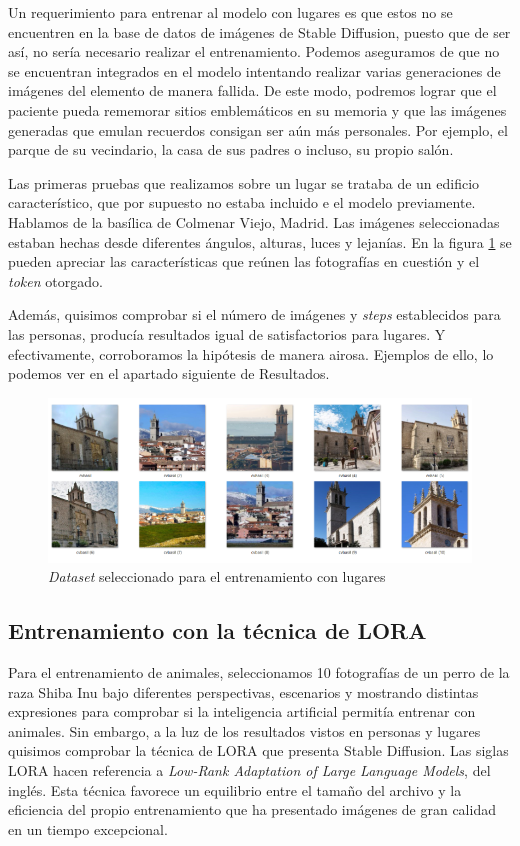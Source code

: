 Un requerimiento para entrenar al modelo con lugares es que estos no se encuentren en la base de datos de imágenes de Stable Diffusion, puesto que de ser así, no sería necesario realizar el entrenamiento. Podemos aseguramos de que no se encuentran integrados en el modelo intentando realizar varias generaciones de imágenes del elemento de manera fallida. De este modo, podremos lograr que el paciente pueda rememorar sitios emblemáticos en su memoria y que las imágenes generadas que emulan recuerdos consigan ser aún más personales. Por ejemplo, el parque de su vecindario, la casa de sus padres o incluso, su propio salón. 

Las primeras pruebas que realizamos sobre un lugar se trataba de un edificio característico, que por supuesto no estaba incluido e el modelo previamente. Hablamos de la basílica de Colmenar Viejo, Madrid. Las imágenes seleccionadas estaban hechas desde diferentes ángulos, alturas, luces y lejanías. En la figura \ref{fig:datasetcolme} se pueden apreciar las características que reúnen las fotografías en cuestión y el \textit{token} otorgado.

Además, quisimos comprobar si el número de imágenes y \textit{steps} establecidos para las personas, producía resultados igual de satisfactorios para lugares. Y efectivamente, corroboramos la hipótesis de manera airosa. Ejemplos de ello, lo podemos ver en el apartado siguiente de Resultados.  

\begin{figure}[!htb]
	\centering
	\includegraphics[width = 0.7
	\textwidth]{Imagenes/Vectorial/dataset_colmenar.png}
	\caption{\textit{Dataset} seleccionado para el entrenamiento con lugares}
	\label{fig:datasetcolme}
\end{figure}


\subsection{Entrenamiento con la técnica de LORA}

Para el entrenamiento de animales, seleccionamos 10 fotografías de un perro de la raza Shiba Inu bajo diferentes perspectivas, escenarios y mostrando distintas expresiones para comprobar si la inteligencia artificial permitía entrenar con animales. Sin embargo, a la luz de los resultados vistos en personas y lugares quisimos comprobar la técnica de LORA que presenta Stable Diffusion. Las siglas LORA hacen referencia a \textit{Low-Rank Adaptation of Large Language Models}, del inglés. Esta técnica favorece un equilibrio entre el tamaño del archivo y la eficiencia del propio entrenamiento que ha presentado imágenes de gran calidad en un tiempo excepcional. 

